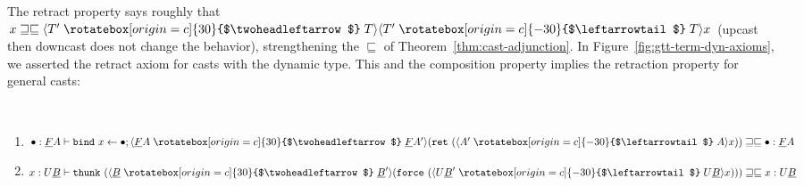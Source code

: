 \documentclass[acmsmall,screen,12pt]{acmart}
\renewcommand{\u}{\underline}
\newcommand{\ltdyn}{\sqsubseteq}
\newcommand{\gtdyn}{\sqsupseteq}
\newcommand{\equidyn}{\mathrel{\gtdyn\ltdyn}}
\newcommand{\dynv}{{?}}
\newcommand{\uarrow}{\mathrel{\rotatebox[origin=c]{-30}{$\leftarrowtail$}}}
\newcommand{\darrow}{\mathrel{\rotatebox[origin=c]{30}{$\twoheadleftarrow$}}}
\newcommand{\upcast}[2]{\langle{#2}\uarrow{#1}\rangle}
\newcommand{\dncast}[2]{\langle{#1}\darrow{#2}\rangle}
\newcommand{\bindXtoYinZ}[2]{\kw{bind}#2 \leftarrow #1;}
\newcommand{\kw}[1]{\texttt{#1}\,\,}
\newcommand{\ret}{\kw{ret}}
\newcommand{\thunk}{\kw{thunk}}
\newcommand{\force}{\kw{force}}
\begin{document}
The retract property says roughly that $x \equidyn
\dncast{T'}{T}{\upcast{T}{T'}{x}}$ (upcast then downcast does not change
the behavior), strengthening the $\ltdyn$ of
Theorem~\ref{thm:cast-adjunction}.  In
Figure~\ref{fig:gtt-term-dyn-axioms}, we asserted the retract axiom for
casts with the dynamic type.  This and the composition property implies
the retraction property for general casts:
\begin{theorem} ~~~ \label{thm:retract-general}
  \begin{enumerate}
  \item
    $\bullet : \u F A \vdash \bindXtoYinZ{\bullet}{x}{\dncast{\u F A}{\u F A'}{(\ret{(\upcast{A}{A'}{x})})}} \equidyn \bullet  : \u F A$
  \item
    $x : U \u B \vdash \thunk{(\dncast{\u B}{\u B'}{(\force{(\upcast{U \u B}{U \u B'}{x})})})} \equidyn x : U \u B$
  \end{enumerate}
\end{theorem}
\end{document}
